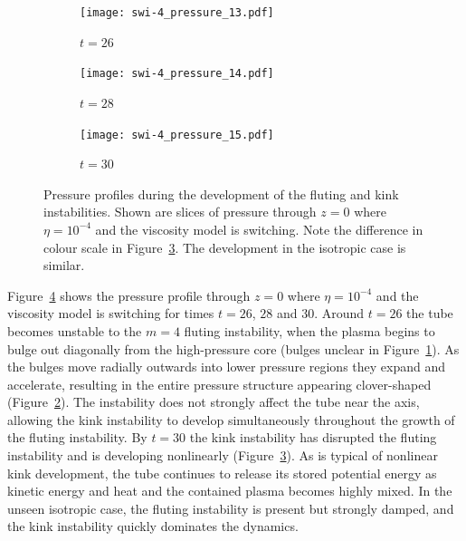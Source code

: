 \begin{figure}[t]
  \centering
    \begin{subfigure}{0.32\textwidth}
      \texttt{[image: swi-4\_pressure\_13.pdf]}
      \caption{$t=26$}
      \label{fig:swi-4_pressure_13}
    \end{subfigure}
    \hfill
    \begin{subfigure}{0.32\textwidth}
      \texttt{[image: swi-4\_pressure\_14.pdf]}
      \caption{$t=28$}
      \label{fig:swi-4_pressure_14}
    \end{subfigure}
    \hfill
    \begin{subfigure}{0.32\textwidth}
      \texttt{[image: swi-4\_pressure\_15.pdf]}
      \caption{$t=30$}
      \label{fig:swi-4_pressure_15}
    \end{subfigure}
\caption{Pressure profiles during the development of the fluting and kink instabilities. Shown are slices of pressure through $z=0$ where $\eta = 10^{-4}$ and the viscosity model is switching. Note the difference in colour scale in Figure~\ref{fig:swi-4_pressure_15}. The development in the isotropic case is similar.}
\label{fig:kink_pressure_slices-4}%
\end{figure}

Figure~\ref{fig:kink_pressure_slices-4} shows the pressure profile through $z=0$ where $\eta=10^{-4}$ and the viscosity model is switching for times $t=26$, $28$ and $30$. Around $t=26$ the tube becomes unstable to the $m=4$ fluting instability, when the plasma begins to bulge out diagonally from the high-pressure core (bulges unclear in Figure~\ref{fig:swi-4_pressure_13}). As the bulges move radially outwards into lower pressure regions they expand and accelerate, resulting in the entire pressure structure appearing clover-shaped (Figure~\ref{fig:swi-4_pressure_14}). The instability does not strongly affect the tube near the axis, allowing the kink instability to develop simultaneously throughout the growth of the fluting instability. By $t=30$ the kink instability has disrupted the fluting instability and is developing nonlinearly (Figure~\ref{fig:swi-4_pressure_15}). As is typical of nonlinear kink development, the tube continues to release its stored potential energy as kinetic energy and heat and the contained plasma becomes highly mixed. In the unseen isotropic case, the fluting instability is present but strongly damped, and the kink instability quickly dominates the dynamics.

